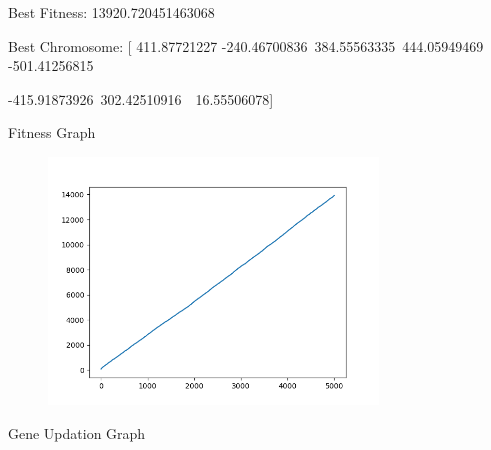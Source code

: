 \documentclass[12pt]{article}
\renewcommand{\_}{\kern-1.5pt\textunderscore\kern-1.5pt}
\begin{document}
Best Fitness: 13920.720451463068\par

Best Chromosome: [ 411.87721227 -240.46700836\  384.55563335\  444.05949469 -501.41256815\par

 -415.91873926\  302.42510916\ \  16.55506078]\par

{\fontsize{10pt}{12.0pt}\selectfont Fitness Graph\par}\par




\begin{figure}[H]
	\begin{Center}
		\includegraphics[width=3.45in,height=2.59in]{./media/image21.png}
	\end{Center}
\end{figure}



\par


\vspace{\baselineskip}
Gene Updation Graph\par

\par


\printbibliography
\end{document}
